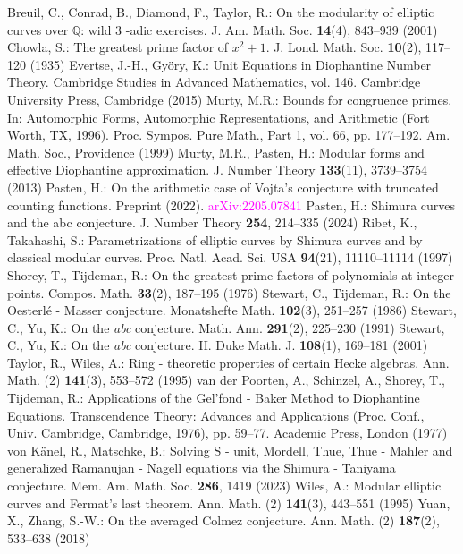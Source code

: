 \documentclass{article}
\begin{document}
\begin{thebibliography}{17}
 Breuil, C., Conrad, B., Diamond, F., Taylor, R.: On the modularity of elliptic curves over $\mathbb{Q}$: wild 3 -adic exercises. J. Am. Math. Soc. \textbf{14}(4), 843–939 (2001)
 Chowla, S.: The greatest prime factor of $x^2 + 1$. J. Lond. Math. Soc. \textbf{10}(2), 117–120 (1935)
 Evertse, J.-H., Györy, K.: Unit Equations in Diophantine Number Theory. Cambridge Studies in Advanced Mathematics, vol. 146. Cambridge University Press, Cambridge (2015)
 Murty, M.R.: Bounds for congruence primes. In: Automorphic Forms, Automorphic Representations, and Arithmetic (Fort Worth, TX, 1996). Proc. Sympos. Pure Math., Part 1, vol. 66, pp. 177–192. Am. Math. Soc., Providence (1999)
 Murty, M.R., Pasten, H.: Modular forms and effective Diophantine approximation. J. Number Theory \textbf{133}(11), 3739–3754 (2013)
 Pasten, H.: On the arithmetic case of Vojta’s conjecture with truncated counting functions. Preprint (2022). \textcolor{magenta}{arXiv:2205.07841}
 Pasten, H.: Shimura curves and the abc conjecture. J. Number Theory \textbf{254}, 214–335 (2024)
 Ribet, K., Takahashi, S.: Parametrizations of elliptic curves by Shimura curves and by classical modular curves. Proc. Natl. Acad. Sci. USA \textbf{94}(21), 11110–11114 (1997)
 Shorey, T., Tijdeman, R.: On the greatest prime factors of polynomials at integer points. Compos. Math. \textbf{33}(2), 187–195 (1976)
 Stewart, C., Tijdeman, R.: On the Oesterlé - Masser conjecture. Monatshefte Math. \textbf{102}(3), 251–257 (1986)
 Stewart, C., Yu, K.: On the \textit{abc} conjecture. Math. Ann. \textbf{291}(2), 225–230 (1991)
 Stewart, C., Yu, K.: On the \textit{abc} conjecture. II. Duke Math. J. \textbf{108}(1), 169–181 (2001)
 Taylor, R., Wiles, A.: Ring - theoretic properties of certain Hecke algebras. Ann. Math. (2) \textbf{141}(3), 553–572 (1995)
 van der Poorten, A., Schinzel, A., Shorey, T., Tijdeman, R.: Applications of the Gel’fond - Baker Method to Diophantine Equations. Transcendence Theory: Advances and Applications (Proc. Conf., Univ. Cambridge, Cambridge, 1976), pp. 59–77. Academic Press, London (1977)
 von Känel, R., Matschke, B.: Solving S - unit, Mordell, Thue, Thue - Mahler and generalized Ramanujan - Nagell equations via the Shimura - Taniyama conjecture. Mem. Am. Math. Soc. \textbf{286}, 1419 (2023)
 Wiles, A.: Modular elliptic curves and Fermat's last theorem. Ann. Math. (2) \textbf{141}(3), 443–551 (1995)
 Yuan, X., Zhang, S.-W.: On the averaged Colmez conjecture. Ann. Math. (2) \textbf{187}(2), 533–638 (2018)
\end{thebibliography}
\end{document}
